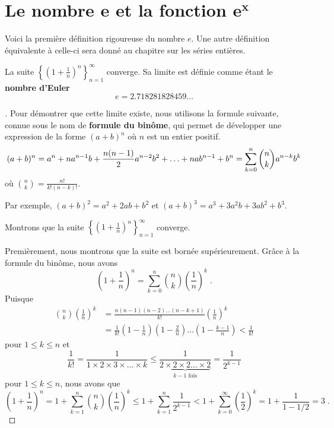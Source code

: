 {\section{Le nombre $\mathbf{e}$ et la fonction $\mathbf{e^x}$}\label{nbrE}


Voici la première définition rigoureuse du nombre $e$.  Une autre
définition équivalente à celle-ci sera donné au chapitre sur les
séries entières.

\begin{focus}{\thm}
La suite
$\displaystyle \left\{\left(1+\frac{1}{n}\right)^n\right\}_{n=1}^\infty$ 
converge.  Sa limite est définie comme étant le {\bfseries nombre
d'Euler}
\[
e=2.718281828459\ldots
\]
\label{limitDefe}
\end{focus}

\begin{proof}[\theory]
Pour démontrer que cette limite existe, nous utilisons la formule
suivante, connue sous le nom de
{\bfseries formule du binôme}, 
qui permet de développer une expression de la forme $(a+b)^n$ où $n$
est un entier positif.
\[
(a+b)^n = a^n + n a^{n-1}b + \frac{n(n-1)}{2}a^{n-2}b^2 + \ldots
+ n a b^{n-1} + b^n \\
= \sum_{k=0}^n \binom{n}{k} a^{n-k} b^k
\]
où $\displaystyle \binom{n}{k} = \frac{n!}{k!(n-k)!}$.

Par exemple, $\displaystyle (a+b)^2 = a^2 + 2ab + b^2$
et $\displaystyle (a+b)^3 = a^3 + 3a^2b + 3ab^2 + b^3$.

Montrons que la suite
$\displaystyle \left\{\left(1+\frac{1}{n}\right)^n\right\}_{n=1}^\infty$ 
converge.

Premièrement, nous montrons que la suite est bornée supérieurement.  Grâce
à la formule du binôme, nous avons
\[
\left( 1 + \frac{1}{n} \right)^n = \sum_{k=0}^n \binom{n}{k}
\left(\frac{1}{n}\right)^k \; .
\]
Puisque
\begin{align*}
\binom{n}{k} \left(\frac{1}{n}\right)^k
&= \frac{n(n-1)(n-2)\ldots(n-k+1)}{k!}\left(\frac{1}{n}\right)^k \\
&= \frac{1}{k!}\left(1-\frac{1}{n}\right)\left(1 - \frac{2}{n}\right)\ldots
\left(1-\frac{k-1}{n}\right)
< \frac{1}{k!}
\end{align*}
pour $1\leq k \leq n$ et
\[
\frac{1}{k!} = \frac{1}{1\times 2\times 3\times \ldots\times k} \leq
\frac{1}{\underbrace{2\times 2 \times 2 \ldots \times 2}_{k-1\text{ fois}}}
 = \frac{1}{2^{k-1}}
\]
pour $1\leq k \leq n$, nous avons que
\[
\left( 1 + \frac{1}{n} \right)^n 
= 1 + \sum_{k=1}^n \binom{n}{k} \left(\frac{1}{n}\right)^k
\leq 1 + \sum_{k=1}^n \frac{1}{2^{k-1}}
< 1 + \sum_{k=0}^\infty \left(\frac{1}{2}\right)^k
= 1 + \frac{1}{1-1/2} = 3 \; .
\]


\end{proof}}

